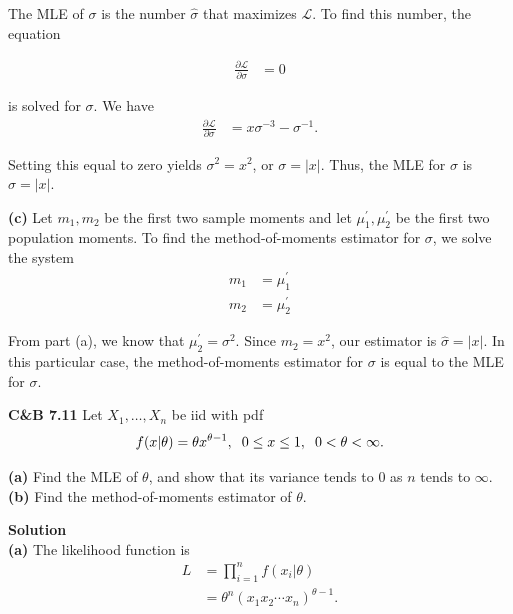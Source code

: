 \documentclass{article}
\newcommand{\mybox}{%
    \collectbox{%
        \setlength{\fboxsep}{1pt}%
        \fbox{\BOXCONTENT}%
    }%
}
\begin{document}
\noindent The MLE of $\sigma$ is the number $\hat{\sigma}$ that maximizes $\mathscr{L}$.  To find this number, the equation 

\begin{align}
\frac{\partial\mathscr{L}}{\partial\sigma} &= 0
\end{align}

\noindent is solved for $\sigma$. We have
\begin{align}
\frac{\partial\mathscr{L}}{\partial\sigma} &= x\sigma^{-3} - \sigma^{-1}.
\end{align}

\noindent Setting this equal to zero yields $\sigma^2 = x^2$, or $\sigma = |x|$.  Thus, the MLE for $\sigma$ is $\hat{\sigma} = |x|$.\\

\vspace{5mm}

\noindent\textbf{(c)} Let $m_1, m_2$ be the first two sample moments and let $\mu^{\prime}_1, \mu^{\prime}_2$ be the first two population moments.  To find the method-of-moments estimator for $\sigma$, we solve the system
\begin{align}
m_1 &= \mu^{\prime}_1 \\
m_2 &= \mu^{\prime}_2
\end{align}

\noindent From part (a), we know that $\mu^{\prime}_2 = \sigma^2$.  Since $m_2 = x^2$, our estimator is $\hat{\sigma} = |x|$.  In this particular case, the method-of-moments estimator for $\sigma$ is equal to the MLE for $\sigma$.  
\pagebreak

\noindent\mybox{\textbf{C\&B 7.11}} Let $X_1, \ldots, X_n$ be iid with pdf $$f(x|\theta) = \theta x^{\theta - 1}, \hspace{2mm} 0\leq x \leq 1, \hspace{2mm} 0 < \theta < \infty.$$
\begin{flushleft}
\textbf{(a)} Find the MLE of $\theta$, and show that its variance tends to $0$ as $n$ tends to $\infty$.  \\
\textbf{(b)} Find the method-of-moments estimator of $\theta$.
\end{flushleft}

\vspace{5mm}
\noindent\mybox{\textbf{Solution}}\\
\noindent\textbf{(a)} The likelihood function is 
\begin{align}
L &= \prod\limits_{i=1}^n f(x_i|\theta) \\
&= \theta^n(x_1 x_2 \cdots x_n)^{\theta - 1}.
\end{align}
\end{document}

